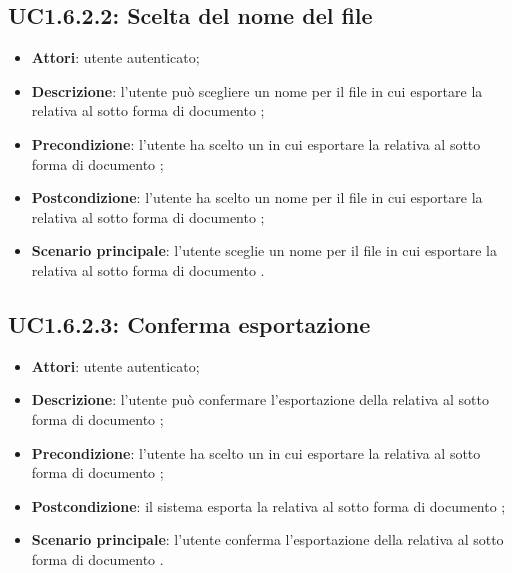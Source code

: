 \subsection{UC1.6.2.2: Scelta del nome del file}
\label{UC1.6.2.2}
\begin{itemize}
\item \textbf{Attori}: utente autenticato;
\item \textbf{Descrizione}: l'utente può scegliere un nome per il file in cui esportare la  relativa al  sotto forma di documento ;
\item \textbf{Precondizione}: l'utente ha scelto un  in cui esportare la  relativa al  sotto forma di documento ;
\item \textbf{Postcondizione}: l'utente ha scelto un nome per il file in cui esportare la  relativa al  sotto forma di documento ;
\item \textbf{Scenario principale}:
l'utente sceglie un nome per il file in cui esportare la  relativa al  sotto forma di documento .
\end{itemize}
\subsection{UC1.6.2.3: Conferma esportazione}
\label{UC1.6.2.3}
\begin{itemize}
\item \textbf{Attori}: utente autenticato;
\item \textbf{Descrizione}: l'utente può confermare l'esportazione della  relativa al  sotto forma di documento ;
\item \textbf{Precondizione}: l'utente ha scelto un  in cui esportare la  relativa al  sotto forma di documento ;
\item \textbf{Postcondizione}: il sistema esporta la  relativa al  sotto forma di documento ;
\item \textbf{Scenario principale}:
l'utente conferma l'esportazione della  relativa al  sotto forma di documento .
\end{itemize}
